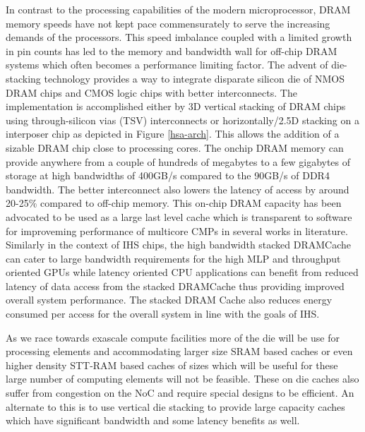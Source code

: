 \par In contrast to the processing capabilities of the modern microprocessor, DRAM memory speeds have not kept pace commensurately to serve the increasing demands of the processors. This speed imbalance coupled with a limited growth in pin counts has led to the memory \cite{memory-wall} and bandwidth \cite{bandwidth-wall} wall for off-chip DRAM systems which often becomes a performance limiting factor. The advent of die-stacking technology \cite{3d-stacking} provides a way to integrate disparate silicon die of NMOS DRAM chips and CMOS logic chips with better interconnects. The implementation is accomplished either by 3D vertical stacking of DRAM chips using through-silicon vias (TSV) interconnects or horizontally/2.5D stacking on a interposer chip as depicted in Figure \ref{hsa-arch}. This allows the addition of a sizable DRAM chip close to processing cores. The onchip DRAM memory can provide anywhere from a couple of hundreds of megabytes to a few gigabytes of storage at high bandwidths of 400GB/s compared to the 90GB/s of DDR4 bandwidth. The better interconnect also lowers the latency of access by around 20-25\% compared to off-chip memory. This on-chip DRAM capacity has been advocated to be used as a large last level cache which is transparent to software for improveming performance of multicore CMPs in several works in literature. Similarly in the context of IHS chips, the high bandwidth stacked DRAMCache can cater to large bandwidth requirements for the high MLP and throughput oriented GPUs while latency oriented CPU applications can benefit from reduced latency of data access from the stacked DRAMCache thus providing improved overall system performance. The stacked DRAM Cache also reduces energy consumed per access for the overall system in line with the goals of IHS.
\par As we race towards exascale compute facilities more of the die will be use for processing elements and accommodating larger size SRAM based caches or even higher density STT-RAM based caches \cite{oscar} of sizes which will be useful for these large number of computing elements will not be feasible. These on die caches also suffer from congestion on the NoC and require special designs to be efficient. An alternate to this is to use vertical die stacking to provide large capacity caches which have significant bandwidth and some latency benefits as well.
